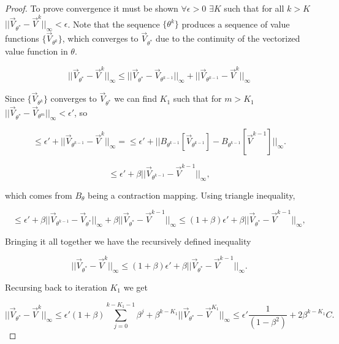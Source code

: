 \documentclass{journal}
\begin{document}
\begin{proof}
To prove convergence it must be shown $\forall \epsilon>0$ $\exists K$ such that for all $k>K$ $||\vec{V}_{\theta^*}-\vec{V}^{k}||_{\infty}< \epsilon$. Note that the sequence $\{\theta^k\}$ produces a sequence of value functions $\{\vec{V}_{\theta^k}\}$, which converges to $\vec{V}_{\theta^*}$ due to the continuity of the vectorized value function in $\theta$.

\begin{equation*}
||\vec{V}_{\theta^*}-\vec{V}^{k}||_{\infty} \leq ||\vec{V}_{\theta^*}-\vec{V}_{\theta^{k-1}}||_{\infty} + ||\vec{V}_{\theta^{k-1}}-\vec{V}^{k}||_{\infty}
\end{equation*}

\noindent Since $\{\vec{V}_{\theta^k}\}$ converges to $\vec{V}_{\theta^*}$ we can find $K_1$ such that for $m>K_1$ $||\vec{V}_{\theta^*}-\vec{V}_{\theta^{m}}||_{\infty} < \epsilon'$, so

\begin{equation*}
\leq \epsilon' + ||\vec{V}_{\theta^{k-1}}-\vec{V}^{k}||_{\infty} = \leq \epsilon' + ||B_{\theta^{k-1}}[\vec{V}_{\theta^{k-1}}]-B_{\theta^{k-1}}[\vec{V}^{k-1}]||_{\infty}.
\end{equation*}

\begin{equation*}
\leq \epsilon' + \beta ||\vec{V}_{\theta^{k-1}}-\vec{V}^{k-1}||_{\infty},
\end{equation*}

\noindent which comes from $B_{\theta}$ being a contraction mapping. Using triangle inequality,

\begin{equation*}
\leq \epsilon' + \beta ||\vec{V}_{\theta^{k-1}}-\vec{V}_{\theta^{*}}||_{\infty} + \beta ||\vec{V}_{\theta^{*}}-\vec{V}^{k-1}||_{\infty} \leq (1+\beta)\epsilon' + \beta ||\vec{V}_{\theta^{*}}-\vec{V}^{k-1}||_{\infty},
\end{equation*}

\noindent Bringing it all together we have the recursively defined inequality

\begin{equation*}
||\vec{V}_{\theta^*}-\vec{V}^{k}||_{\infty}\leq (1+\beta)\epsilon' + \beta ||\vec{V}_{\theta^{*}}-\vec{V}^{k-1}||_{\infty}.
\end{equation*}

\noindent Recursing back to iteration $K_1$ we get 

\begin{equation*}
||\vec{V}_{\theta^*}-\vec{V}^{k}||_{\infty}\leq \epsilon'(1+\beta) \sum_{j=0}^{k-K_1-1} \beta^j + \beta^{k-K_1} ||\vec{V}_{\theta^{*}}-\vec{V}^{K_1}||_{\infty}\leq \epsilon' \frac{1}{(1-\beta^2)} + 2\beta^{k-K_1} C .
\end{equation*}


\end{proof}
\end{document}
